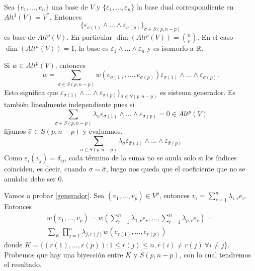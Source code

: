 \documentclass[CV.tex]{subfiles}
\begin{document}
\begin{teorema}
Sea $\{e_1,\dots, e_n\}$ una base de $V$ y $\{\varepsilon_1,\dots, \varepsilon_n\}$ la base dual correspondiente en $Alt^1(V)=V^*$. Entonces 
$$\{\varepsilon_{\sigma(1)}\land\dots\land\varepsilon_{\sigma(p)}\}_{\sigma\in S(p,n-p)}$$
es base de $Alt^p(V)$. En particular $\dim(Alt^p(V))=\binom{n}{p}$. En el caso $\dim(Alt^n(V))=1$, la base es $\varepsilon_1\land\dots\land\varepsilon_n$ y es isomorfo a $\mathbb{R}$.
\end{teorema}
\begin{dem}
Si $w\in Alt^p(V)$, entonces
\begin{equation}\label{generador}
w=\sum_{\sigma\in S(p,n-p)}w(e_{\sigma(1)},\dots,e_{\sigma(p)})\varepsilon_{\sigma(1)}\land\dots\land\varepsilon_{\sigma(p)}.
\end{equation}
Esto significa que $\varepsilon_{\sigma(1)}\land\dots\land\varepsilon_{\sigma(p)}\}_{\sigma\in S(p,n-p)}$ es sistema generador. Es también linealmente independiente pues si
$$\sum_{\sigma\in S(p,n-p)}\lambda_{\sigma}\varepsilon_{\sigma(1)}\land\dots\land\varepsilon_{\sigma(p)}=0\in Alt^p(V)$$
fijamos $\hat{\sigma}\in S(p,n-p)$ y evaluamos.
$$\sum_{\sigma\in S(p,n-p)}\lambda_{\sigma}\varepsilon_{\hat{\sigma}(1)}\land\dots\land\varepsilon_{\hat{\sigma}(p)}$$
 Como $\varepsilon_i(v_j)=\delta_{ij}$, cada término de la suma no se anula solo si los índices coinciden, es decir, cuando $\sigma=\hat{\sigma}$, luego nos queda que el coeficiente que no se anulaba debe ser 0.
 
Vamos a probar \ref{generador}. Sea $(v_1,\dots, v_p)\in V^p$, entonces $v_i=\sum_{r=1}^n\lambda_{i,r}e_r$. Entonces
\begin{gather*}
w(v_1,\dots, v_p)=w(\sum_{r=1}^n\lambda_{1,r}e_r,\dots, \sum_{r=1}^n\lambda_{p,r}e_r)=\\
\sum_K\prod_{j=1}^n\lambda_{j,r(j)}w(e_{r(1)},\dots, e_{r(p)})
\end{gather*}
donde $K=\{(r(1),\dots, r(p)):1\leq r(j)\leq n, r(i)\neq r(j)\ \forall i\neq j\}$. Probemos que hay una biyección entre $K$ y $S(p,n-p)$, con lo cual tendremos el resultado.

\end{dem}
\end{document}
